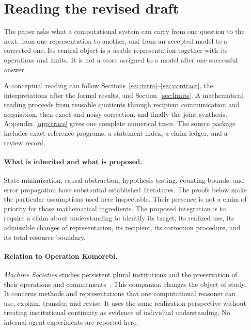 \documentclass[11pt,letterpaper]{article}
\theoremstyle{plain}
\theoremstyle{definition}
\begin{document}
\section*{Reading the revised draft}
The paper asks what a computational system can carry from one question to the next, from one representation to another, and from an accepted model to a corrected one. Its central object is a usable representation together with its operations and limits. It is not a score assigned to a model after one successful answer.

A conceptual reading can follow Sections~\ref{sec:intro}--\ref{sec:contract}, the interpretations after the formal results, and Section~\ref{sec:limits}. A mathematical reading proceeds from reusable quotients through recipient communication and acquisition, then exact and noisy correction, and finally the joint synthesis. Appendix~\ref{app:trace} gives one complete numerical trace. The source package includes exact reference programs, a statement index, a claim ledger, and a review record.

\paragraph{What is inherited and what is proposed.}
State minimization, causal abstraction, hypothesis testing, counting bounds, and error propagation have substantial established literatures. The proofs below make the particular assumptions used here inspectable. Their presence is not a claim of priority for those mathematical ingredients. The proposed integration is to require a claim about understanding to identify its target, its realized use, its admissible changes of representation, its recipient, its correction procedure, and its total resource boundary.

\paragraph{Relation to Operation Komorebi.}
\emph{Machine Societies} studies persistent plural institutions and the preservation of their operations and commitments~\cite{societies}. This companion changes the object of study. It concerns methods and representations that one computational reasoner can use, explain, transfer, and revise. It uses the same realization perspective without treating institutional continuity as evidence of individual understanding. No internal agent experiments are reported here.
\end{document}
